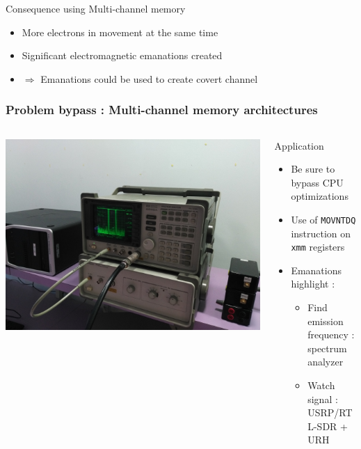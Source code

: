\begin{frame}
\begin{block}{Consequence using Multi-channel memory}
\begin{itemize}
\item More electrons in movement at the same time
\item Significant electromagnetic emanations created
\item $\Rightarrow$ Emanations could be used to create covert channel
\end{itemize}
\end{block}

\end{frame}

\begin{frame}
\frametitle{Problem bypass : Multi-channel memory architectures}

\begin{columns}[c] %
\begin{column}{.28\textwidth}
\centering \includegraphics[scale=.13]{images/spectrum.jpg}
\end{column}%
\hfill%
\begin{column}{.5\textwidth}
\begin{block}{Application}
\begin{itemize}
\item Be sure to bypass CPU optimizations
\item Use of \texttt{MOVNTDQ} instruction on \texttt{xmm} registers
\item Emanations highlight :
\begin{itemize}
\item Find emission frequency : spectrum analyzer
\item Watch signal : USRP/RTL-SDR + URH
\end{itemize}
\end{itemize}
\end{block}
\end{column}%
\end{columns}

\end{frame}




